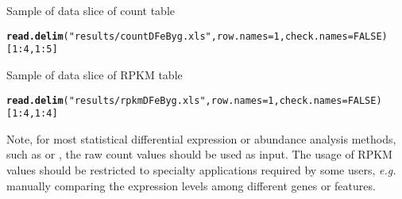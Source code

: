 \documentclass{article}\usepackage[]{graphicx}\usepackage[]{color}
\makeatletter
\newcommand{\hlnum}[1]{\textcolor[rgb]{0.686,0.059,0.569}{#1}}%
\newcommand{\hlstr}[1]{\textcolor[rgb]{0.192,0.494,0.8}{#1}}%
\newcommand{\hlopt}[1]{\textcolor[rgb]{0,0,0}{#1}}%
\newcommand{\hlstd}[1]{\textcolor[rgb]{0.345,0.345,0.345}{#1}}%
\newcommand{\hlkwc}[1]{\textcolor[rgb]{0.333,0.667,0.333}{#1}}%
\newcommand{\hlkwd}[1]{\textcolor[rgb]{0.737,0.353,0.396}{\textbf{#1}}}%
\newenvironment{kframe}{%
 \def\at@end@of@kframe{}%
 \ifinner\ifhmode%
  \def\at@end@of@kframe{\end{minipage}}%
  \begin{minipage}{\columnwidth}%
 \fi\fi%
 \def\FrameCommand##1{\hskip\@totalleftmargin \hskip-\fboxsep
 \colorbox{shadecolor}{##1}\hskip-\fboxsep
     \hskip-\linewidth \hskip-\@totalleftmargin \hskip\columnwidth}%
 \MakeFramed {\advance\hsize-\width
   \@totalleftmargin\z@ \linewidth\hsize
   \@setminipage}}%
 {\par\unskip\endMakeFramed%
 \at@end@of@kframe}
\newenvironment{knitrout}{}{} %
\makeatother
\begin{document}
Sample of data slice of count table
\begin{knitrout}
\color{fgcolor}\begin{kframe}
\begin{alltt}
\hlkwd{read.delim}\hlstd{(}\hlstr{"results/countDFeByg.xls"}\hlstd{,} \hlkwc{row.names}\hlstd{=}\hlnum{1}\hlstd{,} \hlkwc{check.names}\hlstd{=}\hlnum{FALSE}\hlstd{)[}\hlnum{1}\hlopt{:}\hlnum{4}\hlstd{,}\hlnum{1}\hlopt{:}\hlnum{5}\hlstd{]}
\end{alltt}
\end{kframe}
\end{knitrout}
Sample of data slice of RPKM table
\begin{knitrout}
\color{fgcolor}\begin{kframe}
\begin{alltt}
\hlkwd{read.delim}\hlstd{(}\hlstr{"results/rpkmDFeByg.xls"}\hlstd{,} \hlkwc{row.names}\hlstd{=}\hlnum{1}\hlstd{,} \hlkwc{check.names}\hlstd{=}\hlnum{FALSE}\hlstd{)[}\hlnum{1}\hlopt{:}\hlnum{4}\hlstd{,}\hlnum{1}\hlopt{:}\hlnum{4}\hlstd{]}
\end{alltt}
\end{kframe}
\end{knitrout}
Note, for most statistical differential expression or abundance analysis methods, such as  or , the raw count values should be used as input. The usage of RPKM values should be restricted to specialty applications required by some users, \textit{e.g.} manually comparing the expression levels among different genes or features. 
\end{document}
